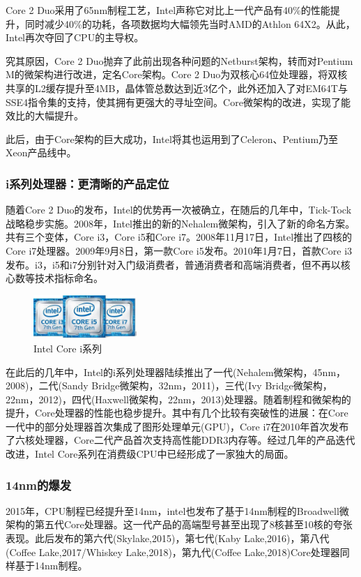 \documentclass[UTF8]{ctexart}
\begin{document}
Core 2 Duo采用了65nm制程工艺，Intel声称它对比上一代产品有40\%的性能提升，同时减少40\%的功耗，各项数据均大幅领先当时AMD的Athlon 64X2。从此，Intel再次夺回了CPU的主导权。

究其原因，Core 2 Duo抛弃了此前出现各种问题的Netburst架构，转而对Pentium M的微架构进行改进，定名Core架构。Core 2 Duo为双核心64位处理器，将双核共享的L2缓存提升至4MB，晶体管总数达到近3亿个，此外还加入了对EM64T与SSE4指令集的支持，使其拥有更强大的寻址空间。Core微架构的改进，实现了能效比的大幅提升。

此后，由于Core架构的巨大成功，Intel将其也运用到了Celeron、Pentium乃至Xeon产品线中。

\subsubsection{i系列处理器：更清晰的产品定位}
随着Core 2 Duo的发布，Intel的优势再一次被确立，在随后的几年中，Tick-Tock战略稳步实施。2008年，Intel推出的新的Nehalem微架构，引入了新的命名方案。共有三个变体，Core i3，Core i5和Core i7。2008年11月17日，Intel推出了四核的Core i7处理器。2009年9月8日，第一款Core i5发布。2010年1月7日，首款Core i3发布。i3，i5和i7分别针对入门级消费者，普通消费者和高端消费者，但不再以核心数等技术指标命名。
\begin{figure}[H]
    \begin{center}
        \includegraphics[width=0.35\textwidth]{figure/core1.jpg}
        \caption{Intel Core i系列}
    \end{center}
\end{figure}

在此后的几年中，Intel的i系列处理器陆续推出了一代(Nehalem微架构，45nm，2008)，二代(Sandy Bridge微架构，32nm，2011)，三代(Ivy Bridge微架构，22nm，2012)，四代(Haxwell微架构，22nm，2013)处理器。随着制程和微架构的提升，Core处理器的性能也稳步提升。其中有几个比较有突破性的进展：在Core一代中的部分处理器首次集成了图形处理单元(GPU)，Core i7在2010年首次发布了六核处理器，Core二代产品首次支持高性能DDR3内存等。经过几年的产品迭代改进，Intel Core系列在消费级CPU中已经形成了一家独大的局面。

\subsubsection{14nm的爆发}
2015年，CPU制程已经提升至14nm，intel也发布了基于14nm制程的Broadwell微架构的第五代Core处理器。这一代产品的高端型号甚至出现了8核甚至10核的夸张表现。此后发布的第六代(Skylake,2015)，第七代(Kaby Lake,2016)，第八代(Coffee Lake,2017/Whiskey Lake,2018)，第九代(Coffee Lake,2018)Core处理器同样基于14nm制程。
\end{document}

